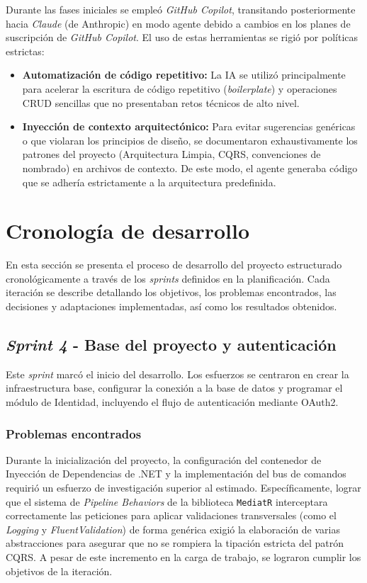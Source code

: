Durante las fases iniciales se empleó \emph{GitHub Copilot}, transitando posteriormente hacia \emph{Claude} (de Anthropic) en modo agente debido a cambios en los planes de suscripción de \emph{GitHub Copilot}. El uso de estas herramientas se rigió por políticas estrictas:
\begin{itemize}
    \item \textbf{Automatización de código repetitivo:} La IA se utilizó principalmente para acelerar la escritura de código repetitivo (\emph{boilerplate}) y operaciones \ac{CRUD} sencillas que no presentaban retos técnicos de alto nivel.
    \item \textbf{Inyección de contexto arquitectónico:} Para evitar sugerencias genéricas o que violaran los principios de diseño, se documentaron exhaustivamente los patrones del proyecto (Arquitectura Limpia, \ac{CQRS}, convenciones de nombrado) en archivos de contexto. De este modo, el agente generaba código que se adhería estrictamente a la arquitectura predefinida.
\end{itemize}

\section{Cronología de desarrollo}
En esta sección se presenta el proceso de desarrollo del proyecto estructurado cronológicamente a través de los \emph{sprints} definidos en la planificación. Cada iteración se describe detallando los objetivos, los problemas encontrados, las decisiones y adaptaciones implementadas, así como los resultados obtenidos.

\subsection{\emph{Sprint 4} - Base del proyecto y autenticación}
Este \emph{sprint} marcó el inicio del desarrollo. Los esfuerzos se centraron en crear la infraestructura base, configurar la conexión a la base de datos y programar el módulo de Identidad, incluyendo el flujo de autenticación mediante OAuth2.

\subsubsection{Problemas encontrados}
Durante la inicialización del proyecto, la configuración del contenedor de Inyección de Dependencias de .NET y la implementación del bus de comandos requirió un esfuerzo de investigación superior al estimado. Específicamente, lograr que el sistema de \emph{Pipeline Behaviors} de la biblioteca \texttt{MediatR} interceptara correctamente las peticiones para aplicar validaciones transversales (como el \emph{Logging} y \emph{FluentValidation}) de forma genérica exigió la elaboración de varias abstracciones para asegurar que no se rompiera la tipación estricta del patrón CQRS. A pesar de este incremento en la carga de trabajo, se lograron cumplir los objetivos de la iteración.

